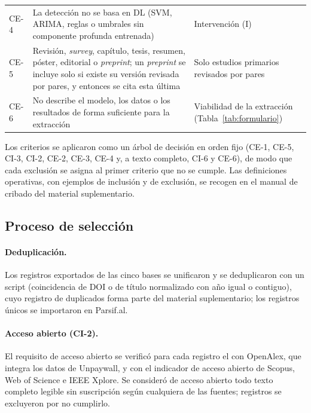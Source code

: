 \documentclass[12pt, a4paper]{article}
\begin{document}
\begin{xltabular}{\linewidth}{lYP{3.4cm}}
CE-4 & La detección no se basa en DL (SVM, ARIMA, reglas o umbrales sin componente profunda entrenada) & Intervención (I) \\
CE-5 & Revisión, \textit{survey}, capítulo, tesis, resumen, póster, editorial o \textit{preprint}; un \textit{preprint} se incluye solo si existe su versión revisada por pares, y entonces se cita esta última & Solo estudios primarios revisados por pares \\
CE-6 & No describe el modelo, los datos o los resultados de forma suficiente para la extracción & Viabilidad de la extracción (Tabla~\ref{tab:formulario}) \\
\end{xltabular}
\endgroup

Los criterios se aplicaron como un árbol de decisión en orden fijo (CE-1, CE-5, CI-3, CI-2, CE-2, CE-3, CE-4 y, a texto completo, CI-6 y CE-6), de modo que cada exclusión se asigna al primer criterio que no se cumple. Las definiciones operativas, con ejemplos de inclusión y de exclusión, se recogen en el manual de cribado del material suplementario.

\subsection{Proceso de selección}
\label{sec:seleccion}

\paragraph{Deduplicación.} Los registros exportados de las cinco bases se unificaron y se deduplicaron con un script (coincidencia de DOI o de título normalizado con año igual o contiguo), cuyo registro de duplicados forma parte del material suplementario; los registros únicos se importaron en Parsif.al.

\paragraph{Acceso abierto (CI-2).} El requisito de acceso abierto se verificó para cada registro el \FechaOA{} con OpenAlex, que integra los datos de Unpaywall, y con el indicador de acceso abierto de Scopus, Web of Science e IEEE Xplore. Se consideró de acceso abierto todo texto completo legible sin suscripción según cualquiera de las fuentes; \NexclOA{} registros se excluyeron por no cumplirlo.
\end{document}
